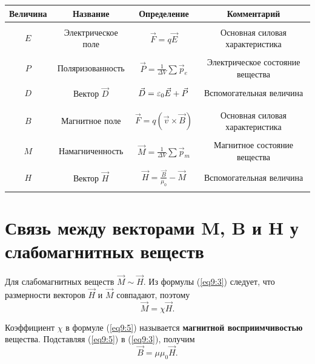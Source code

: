     \begin{tabular}[ht]{|c|c|c|c|} \hline
    Величина & Название & Определение & Комментарий \\ \hline
    &&&\\
    \( E \) & Электрическое поле & \( \vec{F} = q\vec{E} \)
    & Основная силовая характеристика \\ &&&\\
    \( P \) & Поляризованность & \( \vec{P} = \frac{1}{\Delta V}\sum\vec{p}_e \)
    & Электрическое состояние вещества \\ &&&\\
    \( D \) & Вектор \( \vec{D} \) & \( \vec{D} = \varepsilon_0\vec{E} + \vec{P} \)
    & Вспомогательная величина \\ &&&\\ \hline
    &&&\\
    \( B \) & Магнитное поле & \( \vec{F} = q(\vec{v}\times\vec{B}) \) 
    & Основная силовая характеристика \\ &&&\\
    \( M \) & Намагниченность & \( \vec{M} = \frac{1}{\Delta V}\sum\vec{p}_m \)
    & Магнитное состояние вещества \\ &&&\\
    \( H \) & Вектор \( \vec{H} \) & \( \vec{H} = \frac{\vec{B}}{\mu_0}
    - \vec{M} \) & Вспомогательная величина \\ &&&\\ \hline
    \end{tabular}
    
\section{Связь между векторами \textbf{M}, \textbf{B} и \textbf{H} у слабомагнитных веществ}

    Для слабомагнитных веществ \( \vec{M} \sim \vec{H} \). Из формулы
    (\ref{eq9:3}) следует, что размерности векторов \( \vec{H} \) и
    \( \vec{M} \) совпадают, поэтому
    \begin{equation}
        \vec{M} = \chi\vec{H}.
        \label{eq9:5}
    \end{equation}

    Коэффициент \( \chi \) в формуле (\ref{eq9:5}) называется \textbf{магнитной 
    восприимчивостью} вещества. Подставляя (\ref{eq9:5}) в (\ref{eq9:3}),
    получим
    \begin{equation}
        \vec{B} = \mu\mu_0\vec{H}.
        \label{eq9:6}
    \end{equation}


